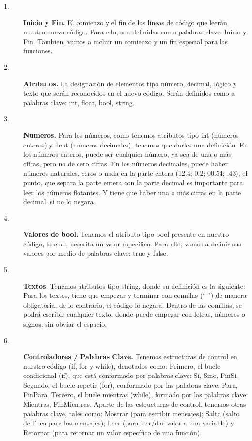 \documentclass{article}
\begin{document}
\begin{description}
    \item[1. ] \textbf{Inicio y Fin.} El comienzo y el fin de las líneas de código que leerán nuestro nuevo código. Para ello, son definidas como palabras clave: Inicio y Fin. Tambien, vamos a incluir un comienzo y un fin especial para las funciones.
    
    \item[2. ] \textbf{Atributos.} La designación de elementos tipo número, decimal, lógico y texto que serán reconocidos en el nuevo código. Serán definidos como a palabras clave: int, float, bool, string.
    
    \item[3. ] \textbf{Numeros.} Para los números, como tenemos atributos tipo int (números enteros) y float (números decimales), tenemos que darles una definición. En los números enteros, puede ser cualquier número, ya sea de una o más cifras, pero no de cero cifras. En los números decimales, puede haber números naturales, ceros o nada en la parte entera (12.4; 0.2; 00.54; .43), el punto, que separa la parte entera con la parte decimal es importante para leer los números flotantes. Y tiene que haber una o más cifras en la parte decimal, si no lo negara. 
    
    \item[4. ] \textbf{Valores de bool.} Tenemos el atributo tipo bool presente en nuestro código, lo cual, necesita un valor específico. Para ello, vamos a definir sus valores por medio de palabras clave: true y false.
    
    \item[5. ] \textbf{Textos.} Tenemos atributos tipo string, donde su definición es la siguiente: Para los textos, tiene que empezar y terminar con comillas (“ ") de manera obligatoria, de lo contrario, el código lo negara. Dentro de las comillas, se podrá escribir cualquier texto, donde puede empezar con letras, números o signos, sin obviar el espacio.
    
    \item[6. ] \textbf{Controladores / Palabras Clave.} Tenemos estructuras de control en nuestro código (if, for y while), denotados como:
 Primero, el bucle condicional (if), que está conformado por palabras clave: Si, Sino, FinSi. Segundo, el bucle repetir (for), conformado por las palabras clave: Para, FinPara. Tercero, el bucle mientras (while), formado por las palabras clave: Mientras, FinMientras.
    Aparte de las estructuras de control, tenemos otras palabras clave, tales como: Mostrar (para escribir mensajes); Salto (salto de línea para los mensajes); Leer (para leer/dar valor a una variable) y Retornar (para retornar un valor específico de una función).
    

\end{description}
\end{document}
